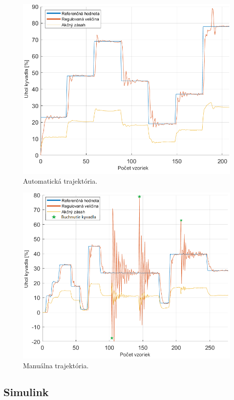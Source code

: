 \begin{figure}[!tbh]
	\centering
	\includegraphics[width=125mm]{obr/PIDautomaMat.png}
	\caption{Automatická trajektória.}\label{OBRAZOK 2.6.2}
\end{figure}
\begin{figure}[!tbh]
	\centering
	\includegraphics[width=125mm]{obr/pidmanualbuchh.png}
	\caption{Manuálna trajektória.}\label{OBRAZOK 2.6.3}
\end{figure}

\newpage 
\subsection{Simulink}


